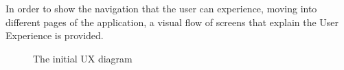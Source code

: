 In order to show the navigation that the user can experience, moving into different pages of the application, a visual flow of screens that explain the User Experience is provided.

\begin{center}
\begin{figure}[htp] 
\caption{The initial UX diagram} 
\label{fig:basicux} 
\end{figure} 
\end{center}